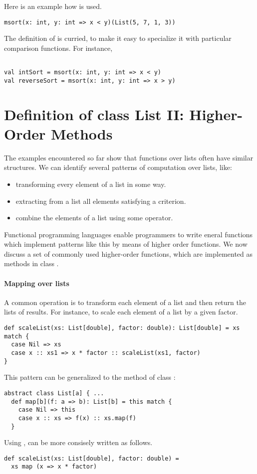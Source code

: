 \documentclass[a4paper,12pt,twoside,titlepage]{book}
\begin{document}
Here is an example how  is used.
\begin{lstlisting}
msort(x: int, y: int => x < y)(List(5, 7, 1, 3))
\end{lstlisting}
The definition of  is curried, to make it easy to specialize it with particular
comparison functions. For instance,
\begin{lstlisting}

val intSort = msort(x: int, y: int => x < y)
val reverseSort = msort(x: int, y: int => x > y)
\end{lstlisting}

\section{Definition of class List II: Higher-Order Methods}

The examples encountered so far show that functions over lists often
have similar structures. We can identify several patterns of
computation over lists, like:
\begin{itemize}
      \item transforming every element of a list in some way.
      \item extracting from a list all elements satisfying a criterion.
      \item combine the elements of a list using some operator.
\end{itemize}
Functional programming languages enable programmers to write eneral
functions which implement patterns like this by means of higher order
functions. We now discuss a set of commonly used higher-order
functions, which are implemented as methods in class .

\paragraph{Mapping over lists}
A common operation is to transform each element of a list and then
return the lists of results.  For instance, to scale each element of a
list by a given factor.
\begin{lstlisting}
def scaleList(xs: List[double], factor: double): List[double] = xs match {
  case Nil => xs
  case x :: xs1 => x * factor :: scaleList(xs1, factor)
}
\end{lstlisting}
This pattern can be generalized to the  method of class :
\begin{lstlisting}
abstract class List[a] { ...
  def map[b](f: a => b): List[b] = this match {
    case Nil => this
    case x :: xs => f(x) :: xs.map(f)
  }
\end{lstlisting}
Using ,  can be more consisely written as follows.
\begin{lstlisting}
def scaleList(xs: List[double], factor: double) = 
  xs map (x => x * factor)
\end{lstlisting}
\end{document}
